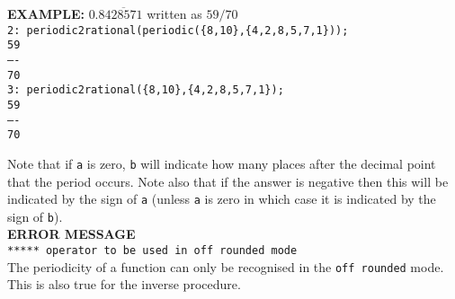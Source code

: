 \begin{tabbing}
\textbf{EXAMPLE:}
    \> $0.8\overline{428571}$ written as $59/70$ \\
    \> \texttt{2: periodic2rational(periodic(\{8,10\},\{4,2,8,5,7,1\}));}
\\[\baselineskip]
    \> \hspace{1mm} \texttt{59}\\
    \> \texttt{----}\\
    \> \hspace{1mm} \texttt{70}\\[\baselineskip]
    \> \texttt{3: periodic2rational(\{8,10\},\{4,2,8,5,7,1\});}
\\[\baselineskip]
    \> \hspace{1mm} \texttt{59}\\
    \> \texttt{----}\\
    \> \hspace{1mm} \texttt{70}
\end{tabbing}

Note that if \texttt{a} is zero, \texttt{b} will indicate how many places
after the decimal point that the period occurs. Note also that if the answer
is negative then this will be indicated by the sign of \texttt{a} (unless
\texttt{a} is zero in which case it is indicated by the sign of \texttt{b}).
\\[\baselineskip]


\textbf{ERROR MESSAGE}\\

\texttt{***** operator to be used in off rounded mode}\\

The periodicity of a function can only be recognised in
the \texttt{off rounded} mode. This is also true for the inverse
procedure.\\[\baselineskip]





